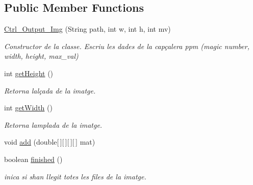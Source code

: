 \subsection*{Public Member Functions}
\begin{DoxyCompactItemize}
\item 
\hyperlink{classpersistencia_1_1output_1_1Ctrl__Output__Img_aa3f2948dd4645d8b121eedf30daa0c3f}{Ctrl\+\_\+\+Output\+\_\+\+Img} (String path, int w, int h, int mv)
\begin{DoxyCompactList}\small\item\em Constructor de la classe. Escriu les dades de la capçalera ppm (magic number, width, height, max\+\_\+val) \end{DoxyCompactList}\item 
int \hyperlink{classpersistencia_1_1output_1_1Ctrl__Output__Img_a736bcf38410d875d9b4a17fd2a95cc4d}{get\+Height} ()
\begin{DoxyCompactList}\small\item\em Retorna l\textquotesingle{}alçada de la imatge. \end{DoxyCompactList}\item 
int \hyperlink{classpersistencia_1_1output_1_1Ctrl__Output__Img_ab6e88e466e6b7d7d847be2ac9c26c529}{get\+Width} ()
\begin{DoxyCompactList}\small\item\em Retorna l\textquotesingle{}amplada de la imatge. \end{DoxyCompactList}\item 
void \hyperlink{classpersistencia_1_1output_1_1Ctrl__Output__Img_a305a977f4d4b999cf65e14e7106b6c5e}{add} (double\mbox{[}$\,$\mbox{]}\mbox{[}$\,$\mbox{]}\mbox{[}$\,$\mbox{]}\mbox{[}$\,$\mbox{]} mat)
\item 
boolean \hyperlink{classpersistencia_1_1output_1_1Ctrl__Output__Img_a365d043ee5bd08c4e470bff468773552}{finished} ()
\begin{DoxyCompactList}\small\item\em inica si s\textquotesingle{}han llegit totes les files de la imatge. \end{DoxyCompactList}\end{DoxyCompactItemize}
